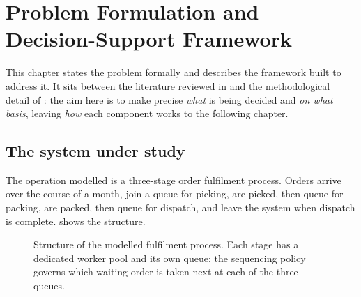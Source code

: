 \chapter[Problem Formulation and Decision-Support Framework]%
        {Problem Formulation and\\Decision-Support \mbox{Framework}}
\label{ch:framework}

This chapter states the problem formally and describes the framework built to address it. It
sits between the literature reviewed in  and the methodological detail of
: the aim here is to make precise \emph{what} is being decided and
\emph{on what basis}, leaving \emph{how} each component works to the following chapter.

\section{The system under study}
\label{sec:system}

The operation modelled is a three-stage order fulfilment process. Orders arrive over the course
of a month, join a queue for picking, are picked, then queue for packing, are packed, then
queue for dispatch, and leave the system when dispatch is complete.  shows the
structure.

\begin{figure}[htbp]
\centering
{}
\caption[Structure of the modelled fulfilment process]{Structure of the modelled fulfilment
process. Each stage has a dedicated worker pool and its own queue; the sequencing policy
governs which waiting order is taken next at each of the three queues.}
\label{fig:flow}
\end{figure}

